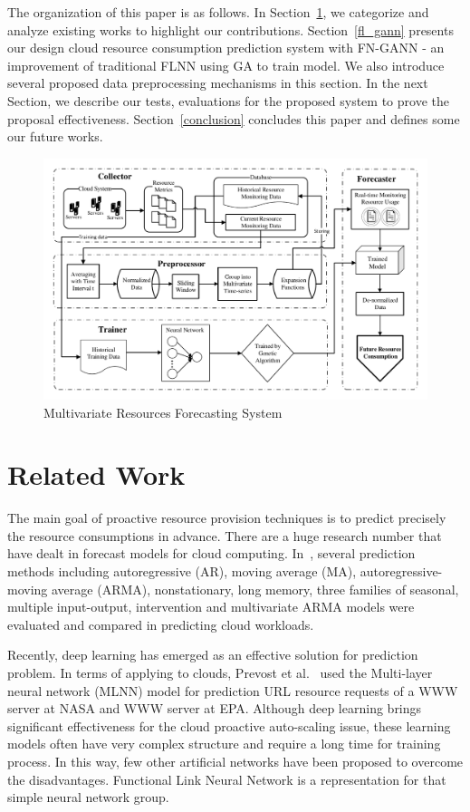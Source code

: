 \documentclass[conference]{IEEEtran}
\begin{document}
The organization of this paper is as follows. In Section~\ref{related_work}, we categorize and analyze existing works to highlight our contributions. Section~\ref{fl_gann} presents our design cloud resource consumption prediction system with FN-GANN - an improvement of traditional FLNN using GA to train model. We also introduce several proposed data preprocessing mechanisms in this section. In the next Section, we describe our tests, evaluations for the proposed system to prove the proposal effectiveness. Section~\ref{conclusion} concludes this paper and defines some our future works.

\begin{figure}[h]
	\centerline{\includegraphics[width=0.7\textwidth =0.1cm 0.1cm 0.1cm 0.1cm, clip]{images/FLGANN_system.pdf}}
	\caption{Multivariate Resources Forecasting System}
	\label{FLGANN_system}
\end{figure}
     
\section{Related Work}
\label{related_work}

The main goal of proactive resource provision techniques is to predict precisely the resource consumptions in advance. There are a huge research number that have dealt in forecast models for cloud computing. In~\cite{ref_hipel}, several prediction methods including autoregressive (AR), moving average (MA), autoregressive-moving average (ARMA), nonstationary, long memory, three families of seasonal, multiple input-output, intervention and multivariate ARMA models were evaluated and compared in predicting cloud workloads. 

Recently, deep learning has emerged as an effective solution for prediction problem. In terms of applying to clouds, Prevost et al.~\cite{ref_prevost} used the Multi-layer neural network (MLNN) model for prediction URL resource requests of a WWW server at NASA and WWW server at EPA. Although deep learning brings significant effectiveness for the cloud proactive auto-scaling issue, these learning models often have very complex structure and require a long time for training process. In this way, few other artificial networks have been proposed to overcome the disadvantages. Functional Link Neural Network is a representation for that simple neural network group.
\end{document}
